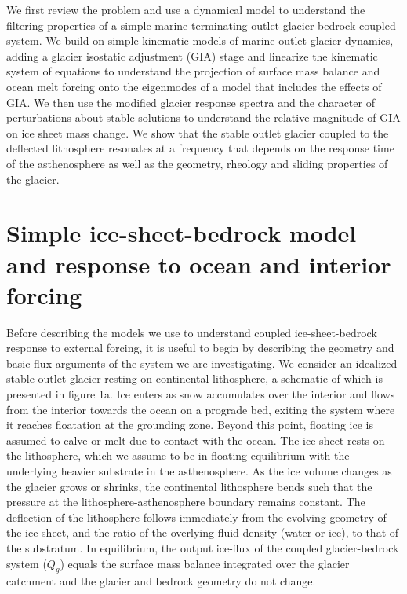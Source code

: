 \documentclass[tc, manuscript]{copernicus}
\begin{document}
We first review the problem and use a dynamical model to understand the filtering properties of a simple marine terminating outlet glacier-bedrock coupled system. We build on simple kinematic models of marine outlet glacier dynamics, adding a glacier isostatic adjustment (GIA) stage and linearize the kinematic system of equations to understand the projection of surface mass balance and ocean melt forcing onto the eigenmodes of a model that includes the effects of GIA. 
We then use the modified glacier response spectra and the character of perturbations about stable solutions to understand the relative magnitude of GIA on ice sheet mass change.
We show that the stable outlet glacier coupled to the deflected lithosphere resonates at a frequency that depends on the response time of the asthenosphere as well as the geometry, rheology and sliding properties of the glacier.

\section{Simple ice-sheet-bedrock model and response to ocean and interior forcing}

Before describing the models we use to understand coupled ice-sheet-bedrock response to external forcing, it is useful to begin by describing the geometry and basic flux arguments of the system we are investigating. We consider an idealized stable outlet glacier resting on continental lithosphere, a schematic of which is presented in figure 1a. 
Ice enters as snow accumulates over the interior and flows from the interior towards the ocean on a prograde bed, exiting the system where it reaches floatation at the grounding zone. Beyond this point, floating ice is assumed to calve or melt due to contact with the ocean. 
The ice sheet rests on the lithosphere, which we assume to be in floating equilibrium with the underlying heavier substrate in the asthenosphere. As the ice volume changes as the glacier grows or shrinks, the continental lithosphere bends such that the pressure at the lithosphere-asthenosphere boundary remains constant.
The deflection of the lithosphere follows immediately from the evolving geometry of the ice sheet, and the ratio of the overlying fluid density (water or ice), to that of the substratum.
In equilibrium, the output ice-flux of the coupled glacier-bedrock system ($Q_g$) equals the surface mass balance integrated over the glacier catchment and the glacier and bedrock geometry do not change.
\end{document}
